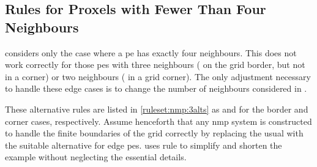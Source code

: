 \subsection{\label{sec:nmp:ruleslessthanfour}Rules for  Proxels with Fewer Than Four Neighbours}

 considers only the case where a \gls{pe} has exactly four neighbours.  This does not work correctly for those \glspl{pe} with three neighbours (\ie{} on the grid border, but not in a corner) or two neighbours (\ie{} in a grid corner).  The only adjustment necessary to handle these edge cases is to change the number of neighbours considered in .

These alternative rules are listed in \cref{ruleset:nmp:3alts} as {} and {} for the border and corner cases, respectively.  Assume henceforth that any \gls{nmp} system is constructed to handle the finite boundaries of the grid correctly by replacing the usual  with the suitable alternative for edge \glspl{pe}.   uses rule {} to simplify and shorten the example without neglecting the essential details.

\begin{cprulesetfloat}
    \begin{cpruleset}
        
        \\
        
        
    \end{cpruleset}
    \caption[Alternative forms of \cref{ruleset:nmp:proxspec}'s Rule 1]{\label{ruleset:nmp:3alts}Alternative forms of \cref{ruleset:nmp:proxspec}'s  for \glspl{pe} on the border of a grid or in the corner of a grid, respectively}
\end{cprulesetfloat}

